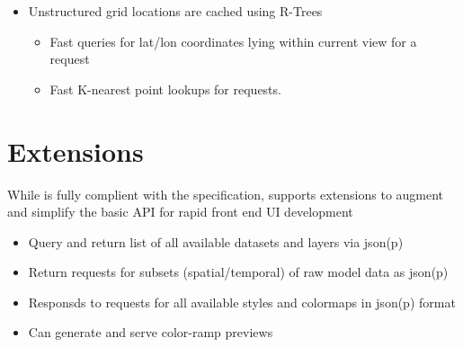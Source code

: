 \documentclass[noback,noborder,portrait,twocolumn]{cuposter}
\begin{document}
\figspace{}

\begin{itemize}
    \item Unstructured grid locations are cached using R-Trees
      \begin{itemize}
        \item Fast queries for lat/lon coordinates lying within
          current view for a \wms{} \getMap{} request
          
        \item Fast K-nearest point lookups for \getFeatureInfo{} requests.
      \end{itemize}
\end{itemize}

\section{\wms{} Extensions}

While \sciwms{} is fully complient with the \ogc{} \wms{}
specification, \sciwms{} supports extensions to augment and simplify
the basic \wms{} API for rapid front end UI development

\begin{itemize}
  \item Query and return list of all available datasets and layers via
    json(p)

  \item Return requests for subsets (spatial/temporal) of raw model
    data as json(p)
    
  \item Responsds to requests for all available styles and colormaps
    in json(p) format
    
  \item Can generate and serve color-ramp previews
\end{itemize}
\end{document}
